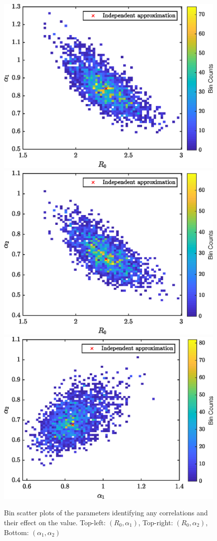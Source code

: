 \documentclass{X:/Documents/Coding/Latex/myassignment}
\begin{document}
\begin{figure}[tbh]
	\centering
	\includegraphics[width=0.45\linewidth]{BinScatter12.eps}
	\includegraphics[width=0.45\linewidth]{BinScatter13.eps}
	\includegraphics[width=0.45\linewidth]{BinScatter23.eps}
	\caption{Bin scatter plots of the parameters identifying any correlations and their effect on the value. Top-left: $(R_0,\alpha_1)$, Top-right: $(R_0, \alpha_2)$, Bottom: $(\alpha_1,\alpha_2)$}
	\label{fig:binscatter}
\end{figure}
\end{document}
